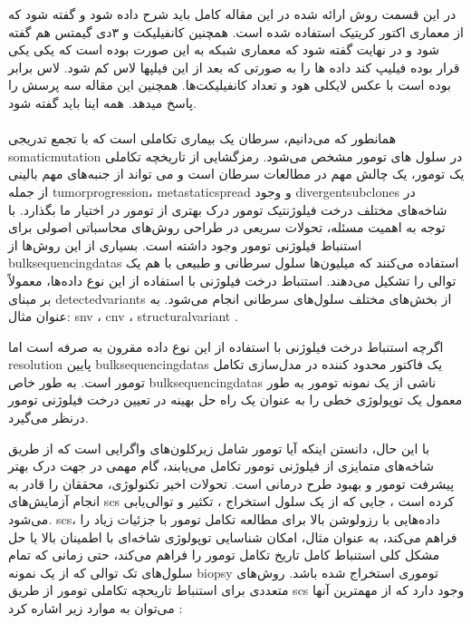 در این قسمت روش ارائه شده در این مقاله کامل باید شرح داده شود و گفته شود که از معماری اکتور کریتیک استفاده شده است. همچنین کانفیلیکت و ۳دی گیمتس هم گفته شود و در نهایت گفته شود که معماری شبکه به این صورت بوده است که یکی یکی قرار بوده فیلیپ کند داده ها را به صورتی که بعد از این فیلپها لاس کم شود. لاس برابر بوده است با عکس لایکلی هود و تعداد کانفیلیکت‌ها. همچنین این مقاله سه پرسش را پاسخ میدهد.
همه اینا باید گفته شود.
\\
\\
همانطور که می‌دانیم، سرطان یک بیماری تکاملی است که با تجمع تدریجی \gls{somaticmutation} در سلول های تومور مشخص می‌شود. رمزگشایی از تاریخچه تکاملی یک تومور، یک چالش مهم در مطالعات سرطان است و می تواند از جنبه‌های مهم بالینی از جمله \gls{tumorprogression}،  \gls{metastaticspread} و وجود \gls{divergentsubclones} در شاخه‌های مختلف درخت فیلوژنتیک تومور درک بهتری از تومور در اختیار ما بگذارد. با توجه به اهمیت مسئله، تحولات سریعی در طراحی روش‌های محاسباتی اصولی برای استنباط فیلوژنی تومور وجود داشته است.  بسیاری از این روش‌ها از \glspl{bulksequencingdata} استفاده می‌کنند که  میلیون‌ها سلول سرطانی و طبیعی با هم یک توالی را تشکیل می‌دهند. استنباط درخت فیلوژنی با استفاده از این نوع داده‌ها، معمولاً بر مبنای \gls{detectedvariants} از بخش‌های مختلف سلول‌های سرطانی انجام می‌شود. به عنوان مثال:
 \gls{snv} \cite{strino2013trap, el2015reconstruction, malikic2020studying, donmez2016clonality, satas2017tumor, husic2019mipup}،  \gls{cnv} \cite{zaccaria2017copy}، \gls{structuralvariant} \cite{eaton2018deconvolution, ricketts2020meltos}.
 
 اگرچه استنباط درخت فیلوژنی با استفاده از این نوع داده مقرون به صرفه است اما \gls{resolution} پایین \glspl{bulksequencingdata} یک فاکتور محدود کننده در مدل‌سازی تکامل تومور است. به طور خاص \glspl{bulksequencingdata} ناشی از یک نمونه تومور به طور معمول یک توپولوژی خطی را به عنوان یک راه حل بهینه در تعیین درخت فیلوژنی تومور درنظر می‌گیرد. \cite{donmez2016clonality}
 
 
 با این حال، دانستن اینکه آیا تومور شامل زیرکلون‌های واگرایی است که از طریق شاخه‌های متمایزی از فیلوژنی تومور تکامل می‌یابند، گام مهمی در جهت درک بهتر پیشرفت تومور و بهبود طرح درمانی است. تحولات اخیر تکنولوژی، محققان را قادر به انجام آزمایش‌های \gls{scs} کرده است ، جایی که  از یک سلول استخراج ، تکثیر و توالی‌یابی می‌شود. \gls{scs}، داده‌هایی با رزولوشن بالا برای مطالعه تکامل تومور با جزئیات زیاد را فراهم می‌کند، به عنوان مثال، امکان شناسایی توپولوژی شاخه‌ای با اطمینان بالا یا حل مشکل کلی استنباط کامل تاریخ تکامل تومور را فراهم می‌کند، حتی زمانی که تمام سلول‌های تک توالی که از یک نمونه \gls{biopsy} توموری استخراج شده باشد. روش‌های متعددی برای استنباط تاریحچه تکاملی تومور  از طریق  \gls{scs} وجود دارد که از مهمترین آنها می‌توان به موارد زیر اشاره کرد :  
 
